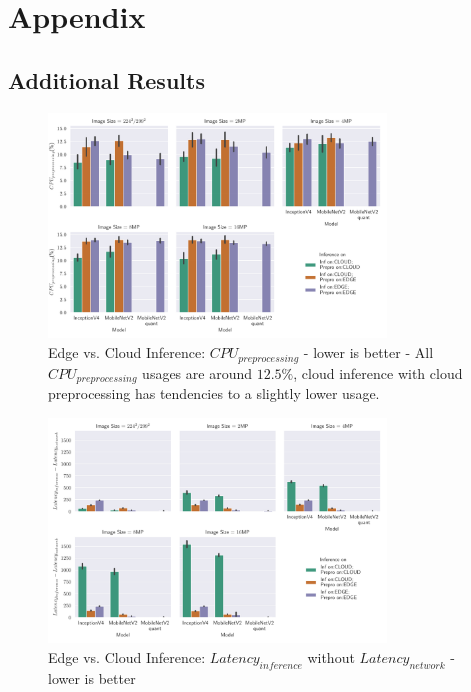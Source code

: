 \appendix
\chapter{Appendix}
\section{Additional Results}

\begin{figure}[!htb]
\centering
\includegraphics[width=0.8\textwidth]{./Bilder/single_plots/edge_vs_cloud_plots/Edge_vs_Cloud_Inference_Preprocessing_CPU.pdf}
\caption[Edge vs. Cloud Inference: $CPU_{preprocessing}$ - lower is better]{Edge vs. Cloud Inference: $CPU_{preprocessing}$ - lower is better - 
All $CPU_{preprocessing}$ usages are around $12.5\%$, cloud inference with cloud preprocessing has tendencies to a slightly lower usage.}
\label{fig:CloudEdgePreproCPU}
\end{figure}

\begin{figure}[!htb]
\centering
\includegraphics[width=0.8\textwidth]{./Bilder/single_plots/edge_vs_cloud_plots/Edge_vs_Cloud_Inference_Inference_Latencies_WITHOUT_NETWORK.pdf}
\caption{Edge vs. Cloud Inference: $Latency_{inference}$ without $Latency_{network}$ - lower is better}
\label{fig:CloudEdgeInfLatWONetwork}
\end{figure}

